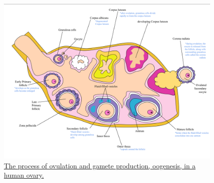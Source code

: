 \begin{figure}

{\centering \includegraphics[width=0.7\linewidth]{./figures/reproductive_system/Oogenesis_Labeled} 

}

\caption{\href{https://commons.wikimedia.org/wiki/File:Oogenesis_Labeled.svg}{The process of ovulation and gamete production, oogenesis, in a human ovary.}}\label{fig:oogenesis}
\end{figure}


